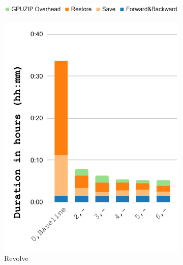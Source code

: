 \documentclass[Ingles]{ic-tese-v3}
\begin{document}
\begin{figure}[]
    \centering
    \begin{subfigure}{0.5\textwidth}
        \includegraphics[width=\textwidth,trim={0 0 0 0},clip]{figures/prefetch_breakdown/prefetch_breakdown_legend.png}
        \label{fig:prefetch_breakdown_legend}
    \end{subfigure}
    \begin{subfigure}{0.3\textwidth}
        \includegraphics[width=\textwidth,trim={0 0 0 0},clip]{figures/prefetch_breakdown/prefetch_breakdown_revolve_salt.pdf}
        \caption{Revolve}
        \label{fig:prefetch_breakdown_revolve}
    \end{subfigure}%
    \begin{subfigure}{0.3\textwidth}

\end{subfigure}
\end{figure}
\end{document}
